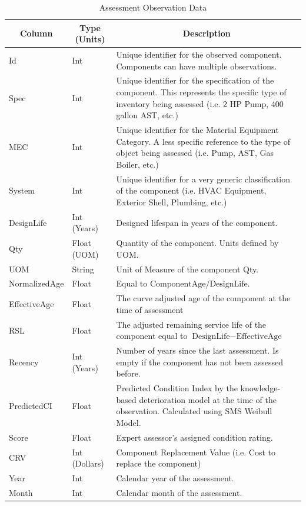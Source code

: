 \documentclass[NewProceedings,letterpaper,NoPageNumbers,NoLineNumbers, DoubleSpace]{ascelike-new}
\begin{document}
\begin{table}
\caption{Assessment Observation Data}
\label{table:assembly}
\centering
\small
\renewcommand{\arraystretch}{1.25}
\begin{tabular}{l l p{3.2in}}
\hline\hline
\multicolumn{1}{c}{Column} &
\multicolumn{1}{c}{Type (Units)} &
\multicolumn{1}{c}{Description} \\
\hline
Id & Int & Unique identifier for the observed component. Components can have multiple observations.\\
Spec & Int & Unique identifier for the specification of the component. This represents the specific type of inventory being assessed (i.e. 2 HP Pump, 400 gallon AST, etc.) \\
MEC & Int & Unique identifier for the Material Equipment Category. A less specific reference to the type of object being assessed (i.e. Pump, AST, Gas Boiler, etc.) \\
System & Int & Unique identifier for a very generic classification of the component (i.e. HVAC Equipment, Exterior Shell, Plumbing, etc.) \\
DesignLife & Int (Years) & Designed lifespan in years of the component. \\
Qty & Float (UOM) & Quantity of the component. Units defined by UOM. \\
UOM & String & Unit of Measure of the component Qty. \\
NormalizedAge & Float & Equal to $\text{ComponentAge} / \text{DesignLife}$. \\
EffectiveAge & Float & The curve adjusted age of the component at the time of assessment \\
RSL & Float & The adjusted remaining service life of the component equal to $\text{DesignLife} - \text{EffectiveAge}$ \\
Recency & Int (Years) & Number of years since the last assessment. Is empty if the component has not been assessed before. \\
PredictedCI & Float & Predicted Condition Index by the knowledge-based deterioration model at the time of the observation. Calculated using SMS Weibull Model. \\
Score & Float & Expert assessor's assigned condition rating. \\
CRV & Int (Dollars) & Component Replacement Value (i.e. Cost to replace the component) \\
Year & Int & Calendar year of the assessment. \\
Month & Int & Calendar month of the assessment. \\

\end{tabular}
\end{table}
\end{document}
